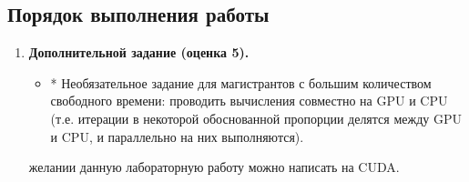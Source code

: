 { %
	\subsection{Порядок выполнения работы}
	\begin{enumerate}
		 необходимо реализовать один (для оценки 3) или два (для оценки 4) этапа вашей программы из предыдущих лабораторных работ. При этом вычисления можно проводить как на CPU, так и на GPU (на своё усмотрение, но GPU предпочтительнее).
		\item\textbf{Дополнительной задание (оценка 5).}
			\begin{itemize}
				 заданий для оценки 3 и 4.
				 доверительного интервала. 
				 время 2 способами: с помощью profiling и с помощью обычного замера (как в предыдущих заданиях).
				 накладные расходы, такие как доля времени, проводимого на каждом этапе вычисления («нормированная
диаграмма с областями и накоплением»), число строк кода, добавленных при распараллеливании, а также грубая оценка времени, потраченного на распараллеливание (накладные расходы программиста), и т.п.
				\item* Необязательное задание для магистрантов с большим количеством свободного времени: проводить вычисления совместно на GPU и CPU (т.е. итерации в некоторой обоснованной пропорции делятся между GPU и CPU, и параллельно на них выполняются).
			\end{itemize}
		 желании данную лабораторную работу можно написать на CUDA.
	\end{enumerate}
}
